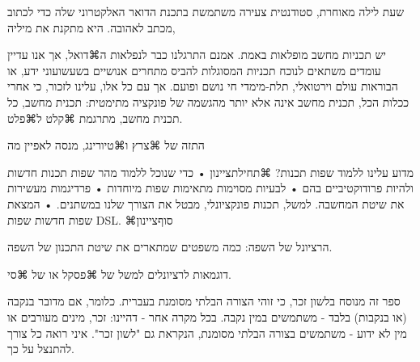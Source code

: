 שעת לילה מאוחרת, סטודנטית צעירה משתמשת בתכנת הדואר האלקטרוני שלה 
כדי לכתוב מכתב לאהובה. 
היא מתקנת את מיליה, 


יש תכניות מחשב מופלאות באמת. 
אמנם התרגלנו כבר לנפלאות ה⌘דואל, אך אנו עדיין עומדים משתאים 
   לנוכח תכניות המסוגלות להביס מתחרים אנושיים בשעשועוני ידע, 
   או הבוראות עולם וירטואלי, תלת-מימדי חי נושם ופועם. 
אך עם כל אלו, עלינו לזכור, כי אחרי ככלות הכל, תכנית מחשב אינה אלא
  יותר מהגשמה של פונקציה מתימטית: 
  תכנית מחשב, כל תכנית מחשב, מתרגמת ⌘קלט ל⌘פלט.
  
התזה של ⌘צרץ ו⌘טיורינג, מנסה לאפיין מה


מדוע עלינו ללמוד שפות תכנות?
⌘תחילת{ציינון}
• כדי שנוכל ללמוד מהר שפות תכנות חדשות ולהיות פרודוקטיביים בהם
• לבעיות מסוימות מתאימות שפות מיוחדות
• פרדיגמות מעשירות את שיטת המחשבה.
למשל, תכנות פונקציונלי, מבטל את הצורך שלנו במשתנים.
• המצאת שפות חדשות
שפות DSL.
⌘סוף{ציינון}

הרציונל של השפה: כמה משפטים שמתארים את שיטת התכנון של השפה.

דוגמאות לרציונלים למשל של ⌘פסקל או של ⌘סי.


ספר זה מנוסח בלשון זכר, כי זוהי הצורה הבלתי מסומנת בעברית. כלומר, אם מדובר
בנקבה (או בנקבות) בלבד - משתמשים במין נקבה. בכל מקרה אחר - דהיינו: זכר, מינים
מעורבים או מין לא ידוע - משתמשים בצורה הבלתי מסומנת, הנקראת גם "לשון זכר". איני
רואה כל צורך להתנצל על כך. 

